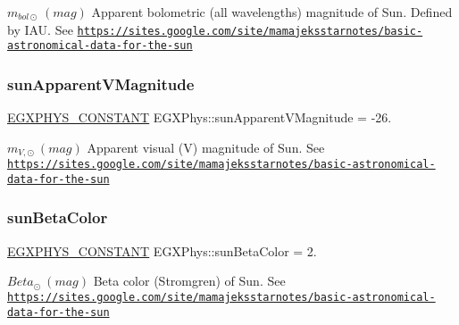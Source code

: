 $ m_{bol\odot} \ (mag)$ Apparent bolometric (all wavelengths) magnitude of Sun. Defined by I\+AU. See \href{https://sites.google.com/site/mamajeksstarnotes/basic-astronomical-data-for-the-sun}{\tt https\+://sites.\+google.\+com/site/mamajeksstarnotes/basic-\/astronomical-\/data-\/for-\/the-\/sun} \mbox{\label{group___e_g_x_phys-_constants-_astrophysics-_solar_system-_sun-_magnitude_gae6c2268677229fc7d08ac9d1e2b50292}} 
\subsubsection{\texorpdfstring{sun\+Apparent\+V\+Magnitude}{sunApparentVMagnitude}}
{\footnotesize\ttfamily \mbox{\hyperlink{group___e_g_x_phys-_constants-_macros_ga76980d288494ce1714c9ac68a95ba702}{E\+G\+X\+P\+H\+Y\+S\+\_\+\+C\+O\+N\+S\+T\+A\+NT}} E\+G\+X\+Phys\+::sun\+Apparent\+V\+Magnitude = -\/26.}

$ m_{V,\odot} \ (mag)$ Apparent visual (V) magnitude of Sun. See \href{https://sites.google.com/site/mamajeksstarnotes/basic-astronomical-data-for-the-sun}{\tt https\+://sites.\+google.\+com/site/mamajeksstarnotes/basic-\/astronomical-\/data-\/for-\/the-\/sun} \mbox{\label{group___e_g_x_phys-_constants-_astrophysics-_solar_system-_sun-_magnitude_ga984a3f3b2fecd776489d45d2f8dbdd54}} 
\subsubsection{\texorpdfstring{sun\+Beta\+Color}{sunBetaColor}}
{\footnotesize\ttfamily \mbox{\hyperlink{group___e_g_x_phys-_constants-_macros_ga76980d288494ce1714c9ac68a95ba702}{E\+G\+X\+P\+H\+Y\+S\+\_\+\+C\+O\+N\+S\+T\+A\+NT}} E\+G\+X\+Phys\+::sun\+Beta\+Color = 2.}

$ Beta_{\odot} \ (mag)$ Beta color (Stromgren) of Sun. See \href{https://sites.google.com/site/mamajeksstarnotes/basic-astronomical-data-for-the-sun}{\tt https\+://sites.\+google.\+com/site/mamajeksstarnotes/basic-\/astronomical-\/data-\/for-\/the-\/sun} \mbox{\label{group___e_g_x_phys-_constants-_astrophysics-_solar_system-_sun-_magnitude_gaaff1876548f51f4837f4d28796a503cc}} 
